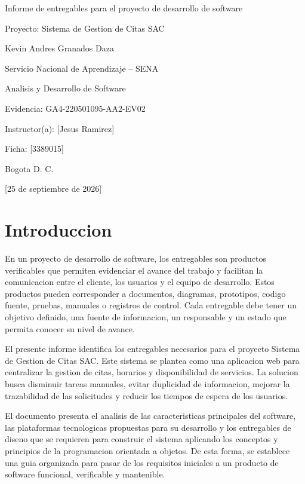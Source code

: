 \documentclass[12pt,letterpaper]{article}
\newcommand{\institucion}{Servicio Nacional de Aprendizaje -- SENA}
\newcommand{\programa}{Analisis y Desarrollo de Software}
\newcommand{\tituloTrabajo}{Informe de entregables para el proyecto de desarrollo de software}
\newcommand{\codigoEvidencia}{GA4-220501095-AA2-EV02}
\newcommand{\nombreProyecto}{Sistema de Gestion de Citas SAC}
\newcommand{\aprendiz}{Kevin Andres Granados Daza}
\newcommand{\instructor}{[Jesus Ramirez]}
\newcommand{\ficha}{[3389015]}
\newcommand{\ciudad}{Bogota D. C.}
\newcommand{\fechaEntrega}{[25 de septiembre de 2026]}
\begin{document}
\begin{titlepage}
    \centering
    \vspace*{2.5cm}
    {\Large \tituloTrabajo\par}
    \vspace{0.8cm}
    {\large Proyecto: \nombreProyecto\par}
    \vfill
    {\large \aprendiz\par}
    \vspace{1.5cm}
    {\large \institucion\par}
    {\large \programa\par}
    \vspace{1cm}
    {\large Evidencia: \codigoEvidencia\par}
    \vspace{1cm}
    {\large Instructor(a): \instructor\par}
    {\large Ficha: \ficha\par}
    \vfill
    {\large \ciudad\par}
    {\large \fechaEntrega\par}
\end{titlepage}

\section{Introduccion}

En un proyecto de desarrollo de software, los entregables son productos verificables que permiten evidenciar el avance del trabajo y facilitan la comunicacion entre el cliente, los usuarios y el equipo de desarrollo. Estos productos pueden corresponder a documentos, diagramas, prototipos, codigo fuente, pruebas, manuales o registros de control. Cada entregable debe tener un objetivo definido, una fuente de informacion, un responsable y un estado que permita conocer su nivel de avance.

El presente informe identifica los entregables necesarios para el proyecto \nombreProyecto. Este sistema se plantea como una aplicacion web para centralizar la gestion de citas, horarios y disponibilidad de servicios. La solucion busca disminuir tareas manuales, evitar duplicidad de informacion, mejorar la trazabilidad de las solicitudes y reducir los tiempos de espera de los usuarios.

El documento presenta el analisis de las caracteristicas principales del software, las plataformas tecnologicas propuestas para su desarrollo y los entregables de diseno que se requieren para construir el sistema aplicando los conceptos y principios de la programacion orientada a objetos. De esta forma, se establece una guia organizada para pasar de los requisitos iniciales a un producto de software funcional, verificable y mantenible.
\end{document}

